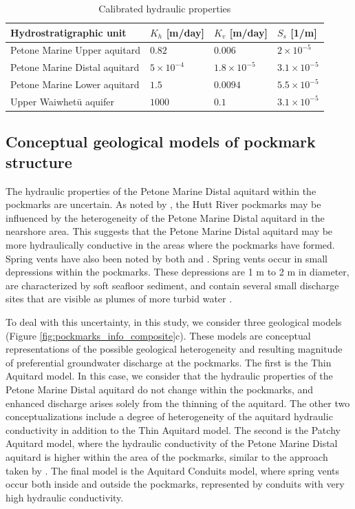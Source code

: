 \documentclass[pdflatex,sn-apa]{sn-jnl}%
\begin{document}
\begin{table}[h!]
\centering
\caption{Calibrated hydraulic properties \protect\citep{bennett_hutt_2024}}
\begin{tabular}{llll}
\hline
Hydrostratigraphic unit & $K_h$ [m/day] & $K_v$ [m/day] & $S_s$ [1/m]  \\
\hline
Petone Marine Upper aquitard & $0.82$& $0.006$  & $2\times 10^{-5}$ \\
Petone Marine Distal aquitard & $5 \times 10^{-4}$& $1.8 \times 10^{-5}$& $3.1\times 10^{-5}$ \\
Petone Marine Lower aquitard & $1.5$& $0.0094$& $5.5\times 10^{-5}$ \\
Upper Waiwhetū aquifer  & $1000$& $0.1$& $3.1\times 10^{-5}$ \\
\hline
\end{tabular}
\label{tab:welly_parameters}
\end{table}

\subsection{Conceptual geological models of pockmark structure}

The hydraulic properties of the Petone Marine Distal aquitard within the pockmarks are uncertain.
As noted by \cite{hoffmann_fresh_2023}, the Hutt River pockmarks may be influenced by the heterogeneity of the Petone Marine Distal aquitard in the nearshore area.
This suggests that the Petone Marine Distal aquitard may be more hydraulically conductive in the areas where the pockmarks have formed.
Spring vents have also been noted by both \cite{harding_characteristics_2000} and \cite{hoffmann_fresh_2023}.
Spring vents occur in small depressions within the pockmarks.
These depressions are 1 m to 2 m in diameter, are characterized by soft seafloor sediment,
and contain several small discharge sites that are visible as plumes of more turbid water \citep{hoffmann_fresh_2023, harding_characteristics_2000}.

To deal with this uncertainty, in this study, we consider three geological models (Figure \ref{fig:pockmarks_info_composite}c).
These models are conceptual representations of the possible geological heterogeneity and resulting magnitude of preferential groundwater discharge at the pockmarks.
The first is the Thin Aquitard model. In this case, we consider that the hydraulic properties of the Petone Marine Distal aquitard do not change within the pockmarks,
and enhanced discharge arises solely from the thinning of the aquitard.
The other two conceptualizations include a degree of heterogeneity of the aquitard hydraulic conductivity in addition to the Thin Aquitard model.
The second is the Patchy Aquitard model, where the hydraulic conductivity of the Petone Marine Distal aquitard is higher within the area of the pockmarks,
similar to the approach taken by \cite{kaleris_modelling_2002}.
The final model is the Aquitard Conduits model, where spring vents occur both inside and outside the pockmarks, represented by conduits with very high hydraulic conductivity.
\end{document}
